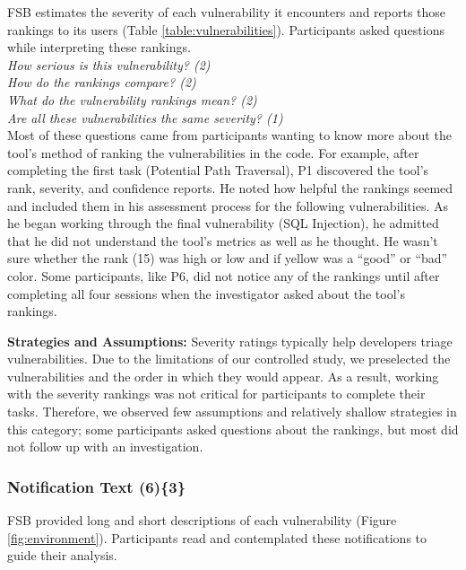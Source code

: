 \documentclass[10pt,journal,compsoc]{IEEEtran}
\begin{document}
\label{bsr}

FSB estimates the severity of each vulnerability it encounters and reports those rankings to its users (Table \ref{table:vulnerabilities}). 
Participants asked questions while interpreting these rankings.
\\

\noindent\emph{How serious is this vulnerability? (2)} \\
\emph{How do the rankings compare? (2)} \\
\emph{What do the vulnerability rankings mean? (2)} \\
\emph{Are all these vulnerabilities the same severity? (1)}
\\
 
Most of these questions came from participants wanting to know more about the tool's method of ranking the vulnerabilities in the code.
For example, after completing the first task (Potential Path Traversal), P1 discovered the tool's rank, severity, and confidence reports. 
He noted how helpful the rankings seemed and included them in his assessment process for the following vulnerabilities.
As he began working through the final vulnerability (SQL Injection), he admitted that he did not understand the tool's metrics as well as he thought. 
He wasn't sure whether the rank (15) was high or low and if yellow was a ``good'' or ``bad'' color.
Some participants, like P6, did not notice any of the rankings until after completing all four sessions when the investigator asked about the tool's rankings.


\textbf{Strategies and Assumptions:}
Severity ratings typically help developers triage vulnerabilities.
Due to the limitations of our controlled study, we preselected the vulnerabilities and the order in which they would appear.
As a result, working with the severity rankings was not critical for participants to complete their tasks.
Therefore, we observed few assumptions and relatively shallow strategies in this category; some participants asked questions about the rankings, but most did not follow up with an investigation.

\subsubsection{Notification Text (6)\{3\}}\label{em}

FSB provided long and short descriptions of each vulnerability (Figure \ref{fig:environment}). 
Participants read and contemplated these notifications to guide their analysis.
\\
\end{document}
